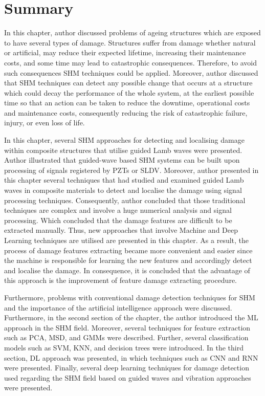 \section{Summary}
\label{sec24}
In this chapter, author discussed problems of ageing structures which are exposed to have several types of damage. 
Structures suffer from damage whether natural or artificial, may reduce their expected lifetime, increasing their maintenance costs, and some time may lead to catastrophic consequences. 
Therefore, to avoid such consequences SHM techniques could be applied.  
Moreover, author discussed that SHM techniques can detect any possible change that occurs at a structure which could decay the performance of the whole system, at the earliest possible time so that an action can be taken to reduce the downtime,  operational costs and maintenance costs, consequently reducing the risk of catastrophic failure, injury, or even loss of life.

In this chapter,  several SHM approaches for detecting and localising damage within composite structures that utilise guided Lamb waves were presented. 
Author illustrated that guided-wave based SHM systems can be built upon processing of signals registered by PZTs or SLDV. 
Moreover, author presented in this chapter several techniques that had studied and examined guided Lamb waves in composite materials to detect and localise the damage using signal processing techniques. 
Consequently, author concluded that those traditional techniques are complex and involve a huge numerical analysis and signal processing. Which concluded that the damage features are difficult to be extracted manually. 
Thus, new approaches that involve Machine and Deep Learning techniques are utilised are presented in this chapter. 
As a result, the process of damage features extracting became more convenient and easier since the machine is responsible for learning the new features and accordingly  detect and localise the damage. 
In consequence, it is concluded that the advantage of this approach is the improvement of feature damage extracting procedure.

Furthermore, problems with conventional damage detection techniques for SHM and the importance of the artificial intelligence approach were discussed.
Furthermore, in the second section of the chapter, the author introduced the ML approach in the SHM field.
Moreover, several techniques for feature extraction such as PCA, MSD, and GMMs were described. 
Further, several classification models such as SVM, KNN, and decision trees were introduced.
In the third section, DL approach was presented, in which techniques such as CNN  and RNN were presented.
Finally, several deep learning techniques for damage detection used regarding the SHM field based on guided waves and vibration approaches were presented.%
